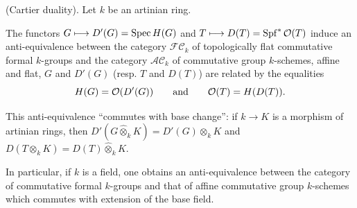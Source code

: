 \begin{proposition}{}(Cartier duality). Let $k$ be an artinian ring.
\begin{enumeratei}
\item The functors $G\longmapsto D'(G)=\operatorname{Spec} H(G)$ and $T\longmapsto D(T)=\operatorname{Spf}^*\mathcal{O}(T)$ induce an anti-equivalence between the category $\mathcal{FC}_k$ of topologically flat commutative formal $k$-groups and the category $\mathcal{AC}_k$ of commutative group $k$-schemes, affine and flat, \ie $G$ and $D'(G)$ (resp. $T$ and $D(T)$) are related by the equalities
\[
H(G)=\mathcal{O}(D'(G))\qquad\text{and}\qquad\mathcal{O}(T)=H(D(T)).
\]
\item This anti-equivalence ``commutes with base change'': if $k\to K$ is a morphism of artinian rings, then $D'(G\widehat\otimes_k K)=D'(G)\otimes_k K$ and $D(T\otimes_k K)=D(T)\widehat\otimes_k K$.
\item In particular, if $k$ is a field, one obtains an anti-equivalence between the category of commutative formal $k$-groups and that of affine commutative group $k$-schemes which commutes with extension of the base field.
\end{enumeratei}
\end{proposition}

